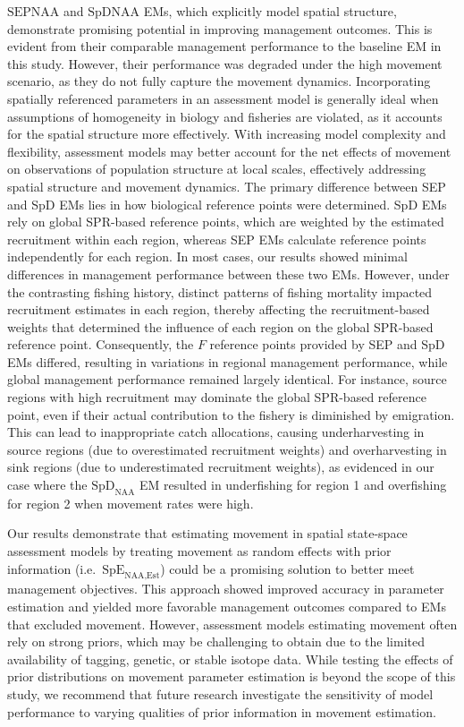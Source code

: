 \documentclass[
  12pt,
]{article}
\begin{document}
\(\text{SEP}{\scriptscriptstyle \text{NAA}}\) and
\(\text{SpD}{\scriptscriptstyle \text{NAA}}\) EMs, which explicitly
model spatial structure, demonstrate promising potential in improving
management outcomes. This is evident from their comparable management
performance to the baseline EM in this study. However, their performance
was degraded under the high movement scenario, as they do not fully
capture the movement dynamics. Incorporating spatially referenced
parameters in an assessment model is generally ideal when assumptions of
homogeneity in biology and fisheries are violated, as it accounts for
the spatial structure more effectively. With increasing model complexity
and flexibility, assessment models may better account for the net
effects of movement on observations of population structure at local
scales, effectively addressing spatial structure and movement dynamics.
The primary difference between SEP and SpD EMs lies in how biological
reference points were determined. SpD EMs rely on global SPR-based
reference points, which are weighted by the estimated recruitment within
each region, whereas SEP EMs calculate reference points independently
for each region. In most cases, our results showed minimal differences
in management performance between these two EMs. However, under the
contrasting fishing history, distinct patterns of fishing mortality
impacted recruitment estimates in each region, thereby affecting the
recruitment-based weights that determined the influence of each region
on the global SPR-based reference point. Consequently, the \(F\)
reference points provided by SEP and SpD EMs differed, resulting in
variations in regional management performance, while global management
performance remained largely identical. For instance, source regions
with high recruitment may dominate the global SPR-based reference point,
even if their actual contribution to the fishery is diminished by
emigration. This can lead to inappropriate catch allocations, causing
underharvesting in source regions (due to overestimated recruitment
weights) and overharvesting in sink regions (due to underestimated
recruitment weights), as evidenced in our case where the
\(\text{SpD}_{\scriptscriptstyle \text{NAA}}\) EM resulted in
underfishing for region 1 and overfishing for region 2 when movement
rates were high.

Our results demonstrate that estimating movement in spatial state-space
assessment models by treating movement as random effects with prior
information (i.e.~\(\text{SpE}_{\scriptscriptstyle \text{NAA,Est}}\))
could be a promising solution to better meet management objectives. This
approach showed improved accuracy in parameter estimation and yielded
more favorable management outcomes compared to EMs that excluded
movement. However, assessment models estimating movement often rely on
strong priors, which may be challenging to obtain due to the limited
availability of tagging, genetic, or stable isotope data. While testing
the effects of prior distributions on movement parameter estimation is
beyond the scope of this study, we recommend that future research
investigate the sensitivity of model performance to varying qualities of
prior information in movement estimation.
\end{document}
